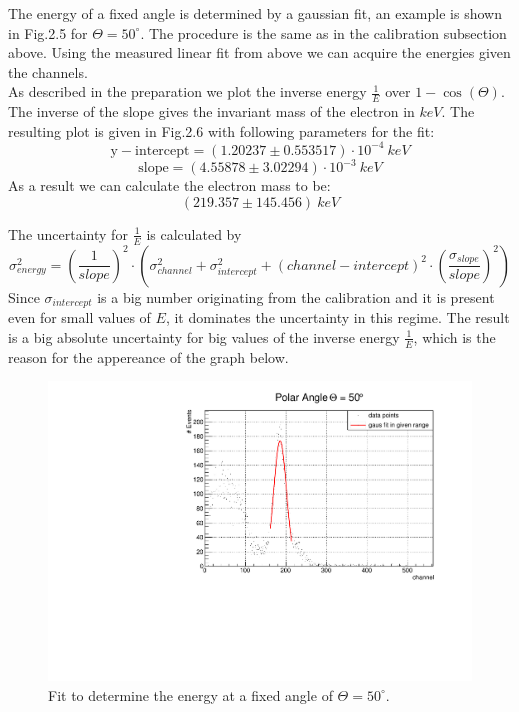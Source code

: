 The energy of a fixed angle is determined by a gaussian fit, an example is shown in Fig.2.5 for $\Theta = 50^{\circ}$. The procedure is the same as in the calibration subsection above. Using the measured linear fit from above we can acquire the energies given the channels.\\
As described in the preparation we plot the inverse energy $\frac{1}{E}$ over $1 - \cos(\Theta)$. The inverse of the slope gives the invariant mass of the electron in $keV$. The resulting plot is given in Fig.2.6 with following parameters for the fit:
$$\mathrm{y-intercept} = (1.20237 \pm 0.553517) \cdot 10^{-4} \ keV$$
$$\mathrm{slope} =  (4.55878 \pm 3.02294) \cdot 10^{-3} \ keV$$
As a result we can calculate the electron mass to be:
$$(219.357 \pm 145.456) \ keV$$

The uncertainty for $\frac{1}{E}$ is calculated by 
$$\sigma _{energy}^{2} = (\frac{1}{slope})^{2} \cdot (\sigma _{channel} ^{2} + \sigma _{intercept} ^{2} + (channel - intercept)^{2} \cdot (\frac{\sigma_{slope}}{slope})^{2}) $$
Since $\sigma _{intercept}$ is a big number originating from the calibration and it is present even for small values of ${E}$, it dominates the uncertainty in this regime. The result is a big absolute uncertainty for big values of the inverse energy $\frac{1}{E}$, which is the reason for the appereance of the graph below.

\begin{figure}[h]
\includegraphics[scale=0.5]{./../plots/50_deg.pdf}
\caption{Fit to determine the energy at a fixed angle of $\Theta = 50^{\circ}$.}
\end{figure}

\newpage

